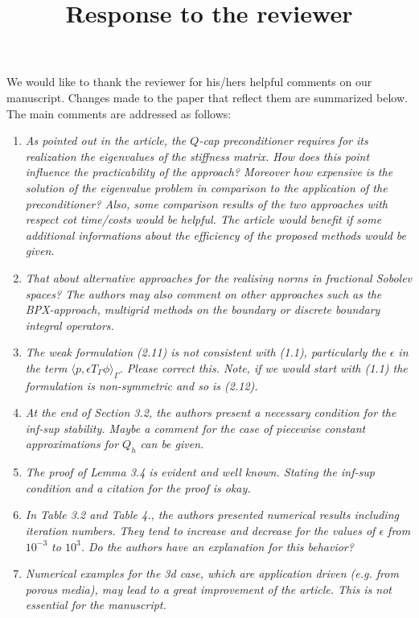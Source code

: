 \documentclass[10pt, a4paper]{article}
\title{\large{Response to the reviewer}}
\date{}
\renewcommand{\brack}[1]{\langle#1\rangle}
\begin{document}
\maketitle

We would like to thank the reviewer for his/hers helpful comments on our manuscript. 
Changes made to the paper that reflect them are summarized below. The main
comments are addressed as follows:

\begin{enumerate}
  \item{\textit{As pointed out in the article, the $Q$-cap preconditioner
    requires for its realization the eigenvalues of the stiffness matrix. How
    does this point influence the practicability of the approach? Moreover how
    expensive is the solution of the eigenvalue problem in comparison to the
    application of the preconditioner? Also, some comparison results of the two
    approaches with respect cot time/costs would be helpful. The article would
    benefit if some additional informations about the efficiency of the proposed
    methods would be given.
    }
}
  \item{\textit{That about alternative approaches for the realising norms in
    fractional Sobolev spaces? The authors may also comment on other approaches
    such as the BPX-approach, multigrid methods on the boundary or discrete
    boundary integral operators.}
    }
  \item{\textit{The weak formulation (2.11) is not consistent with (1.1),
    particularly the $\epsilon$ in the term $\brack{p, \epsilon T_\Gamma
    \phi}_{\Gamma}$. Please correct this. Note, if we would start with (1.1) the
    formulation is non-symmetric and so is (2.12).}
}
  \item{\textit{At the end of Section 3.2, the authors present a necessary
    condition for the inf-sup stability. Maybe a comment for the case of
    piecewise constant approximations for $Q_h$ can be given.}
}
  \item{\textit{The proof of Lemma 3.4 is evident and well known. Stating the
    inf-sup condition and a citation for the proof is okay.}
}
  \item{\textit{In Table 3.2 and Table 4., the authors presented numerical
    results including iteration numbers. They tend to increase and decrease for
    the values of $\epsilon$ from $10^{-3}$ to $10^{3}$. Do the authors have an
    explanation for this behavior?}
}
  \item{\textit{Numerical examples for the 3d case, which are application driven
    (e.g. from porous media), may lead to a great improvement of the article.
    This is not essential for the manuscript.}
}
\end{enumerate}
\end{document}
